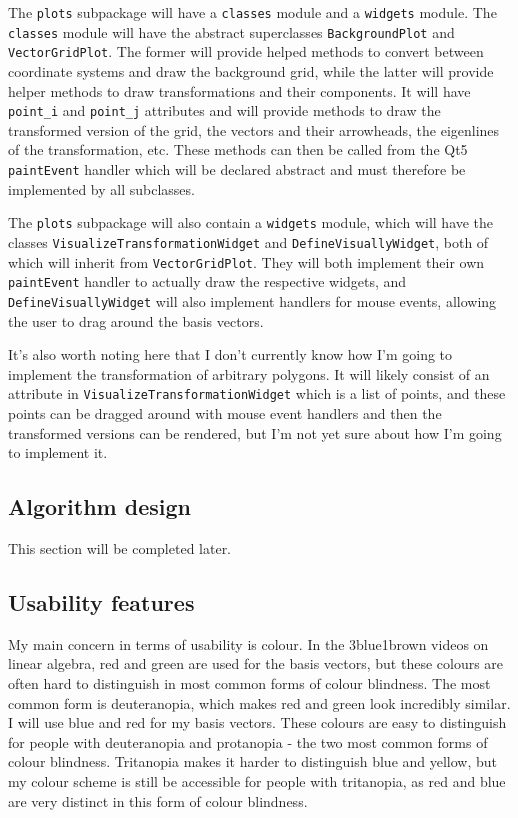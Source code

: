\documentclass[../main.tex]{subfiles}
\begin{document}
The \texttt{plots} subpackage will have a \texttt{classes} module and a \texttt{widgets} module. The \texttt{classes} module will have the abstract superclasses \texttt{BackgroundPlot} and \texttt{VectorGridPlot}. The former will provide helped methods to convert between coordinate systems and draw the background grid, while the latter will provide helper methods to draw transformations and their components. It will have \texttt{point\_i} and \texttt{point\_j} attributes and will provide methods to draw the transformed version of the grid, the vectors and their arrowheads, the eigenlines of the transformation, etc. These methods can then be called from the Qt5 \texttt{paintEvent} handler which will be declared abstract and must therefore be implemented by all subclasses.

The \texttt{plots} subpackage will also contain a \texttt{widgets} module, which will have the classes \texttt{VisualizeTransformationWidget} and \texttt{DefineVisuallyWidget}, both of which will inherit from \texttt{VectorGridPlot}. They will both implement their own \texttt{paintEvent} handler to actually draw the respective widgets, and \texttt{DefineVisuallyWidget} will also implement handlers for mouse events, allowing the user to drag around the basis vectors.

It's also worth noting here that I don't currently know how I'm going to implement the transformation of arbitrary polygons. It will likely consist of an attribute in \texttt{VisualizeTransformationWidget} which is a list of points, and these points can be dragged around with mouse event handlers and then the transformed versions can be rendered, but I'm not yet sure about how I'm going to implement it.

\subsection{Algorithm design\label{subsection:algorithm-design}}


This section will be completed later.

\subsection{Usability features\label{subsection:usability-features}}

My main concern in terms of usability is colour. In the 3blue1brown videos on linear algebra, red and green are used for the basis vectors, but these colours are often hard to distinguish in most common forms of colour blindness. The most common form is deuteranopia\cite{types-of-color-blindness}, which makes red and green look incredibly similar. I will use blue and red for my basis vectors. These colours are easy to distinguish for people with deuteranopia and protanopia - the two most common forms of colour blindness. Tritanopia makes it harder to distinguish blue and yellow, but my colour scheme is still be accessible for people with tritanopia, as red and blue are very distinct in this form of colour blindness.
\end{document}
